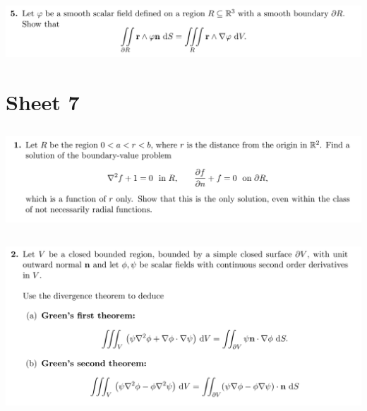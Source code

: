 \documentclass[12pt]{article}
\begin{document}
\subsection{}
\begin{mdframed}
\includegraphics[width=400pt]{img/oxford-prelims-M5-multivariable-calc-6-5.png}
\end{mdframed}

\newpage
\section{Sheet 7}

\subsection{}
\begin{mdframed}
\includegraphics[width=400pt]{img/oxford-prelims-M5-multivariable-calc-7-1.png}
\end{mdframed}

\subsection{}
\begin{mdframed}
\includegraphics[width=400pt]{img/oxford-prelims-M5-multivariable-calc-7-2.png}
\end{mdframed}
\end{document}
